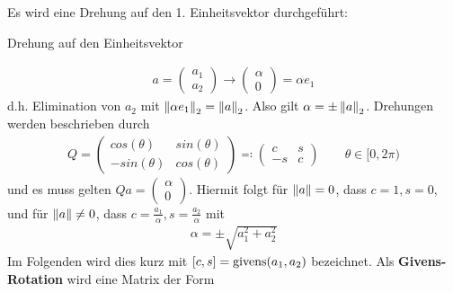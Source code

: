 Es wird eine Drehung auf den 1. Einheitsvektor durchgeführt:
\begin{image}{Drehung auf den Einheitsvektor}
  \label{im4.4.a}
\end{image}
\begin{gather*}
  a=\begin{pmatrix}a_1 \\ a_2\end{pmatrix} \longrightarrow \begin{pmatrix}\alpha \\ 0 \end{pmatrix}
  = \alpha e_1
\end{gather*}
d.h. Elimination von $a_2$ mit $\nn[\alpha e_1]_2 = \nn[a]_2$.
Also gilt $\alpha=\pm \nn[a]_2$.
Drehungen werden beschrieben durch
\begin{gather*}
  Q = \begin{pmatrix}
    cos(\theta) & sin(\theta)\\
    -sin(\theta) & cos(\theta)
  \end{pmatrix}
  \eqqcolon \begin{pmatrix}
    c & s\\
    -s & c
  \end{pmatrix}\qquad \theta \in[0,2\pi)
\end{gather*}
und es muss gelten $Qa = \begin{pmatrix}\alpha\\0\end{pmatrix}$.
Hiermit folgt für $\nn[a]= 0$, dass $c=1, s=0$,
und für $\nn[a]\neq 0$, dass
$c=\frac{a_1}{\alpha},  s= \frac{a_2}{\alpha}$ mit
\begin{gather}
  \alpha = \pm \sqrt{a_1^2+a_2^2}
  \label{IV.4.4}
\end{gather}
Im Folgenden wird dies kurz mit $[c,s] = \Givens(a_1, a_2)$ bezeichnet.
Als \textbf{Givens-Rotation} wird eine Matrix der Form
